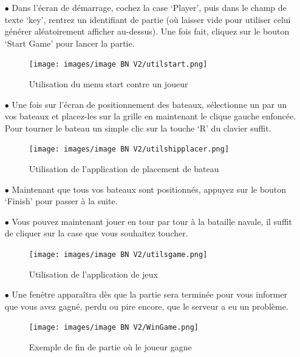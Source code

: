 \documentclass[12pt]{article}
\begin{document}
\begin{itemize}
      \item[$\bullet$] Dans l'écran de démarrage, cochez la case `Player', puis
            dans le champ de texte `key', rentrez un identifiant de partie (où
            laisser vide pour utiliser celui générer aléatoirement afficher
            au-dessus). Une fois fait, cliquez sur le bouton `Start Game' pour
            lancer la partie.
            \begin{figure}[H]
                  \centering
                  \texttt{[image: images/image BN
                        V2/utilstart.png]}
                  \caption{Utilisation du menu start contre un joueur}
            \end{figure}

            \bigskip
      \item[$\bullet$] Une fois sur l'écran de positionnement des bateaux,
            sélectionne un
            par un vos bateaux et placez-les sur la grille en maintenant le
            clique gauche
            enfoncée. Pour tourner le bateau un simple clic sur la touche `R'
            du clavier
            suffit.
            \begin{figure}[H]
                  \centering
                  \texttt{[image: images/image BN
                        V2/utilshipplacer.png]}
                  \caption{Utilisation de l'application de placement de bateau}
            \end{figure}
      \item[$\bullet$] Maintenant que tous vos bateaux sont positionnés,
            appuyez sur
            le bouton `Finish' pour passer à la suite.
      \item[$\bullet$] Vous pouvez maintenant jouer en tour par tour à la
            bataille
            navale, il suffit de cliquer sur la case que vous souhaitez
            toucher.
            \begin{figure}[h]
                  \centering
                  \texttt{[image: images/image BN
                        V2/utilsgame.png]}
                  \caption{Utilisation de l'application de jeux}
            \end{figure}
      \item[$\bullet$] Une fenêtre apparaîtra dès que la partie sera terminée
            pour
            vous informer que vous avez gagné, perdu ou pire encore, que le
            serveur a eu un
            problème.
            \begin{figure}[H]
                  \centering
                  \texttt{[image: images/image BN
                        V2/WinGame.png]}
                  \caption{Exemple de fin de partie où le joueur gagne}
            \end{figure}
\end{itemize}
\end{document}
